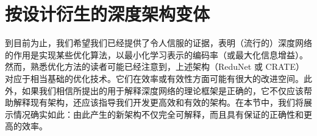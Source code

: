 \documentclass[../../book-main.tex]{subfiles}
\begin{document}
\begin{table*}[t!]
\centering
\caption{\small \textsc{crate} 在不同模型规模下，在 ImageNet-1K 上预训练后，在各种数据集上的 Top-1 分类准确率。对于 ImageNet-1K/ImageNet-1K ReaL，我们直接评估 top-1 准确率。对于其他数据集，我们使用在 ImageNet 上预训练的模型作为初始化，并通过微调评估迁移学习性能。}
\label{tab:crate_comparison_with_sota}
\small
    \setlength{\tabcolsep}{13.6pt}
\end{table*}



\section{按设计衍生的深度架构变体} \label{sec:chap4-derive-white-box-transformer-variants}

到目前为止，我们希望我们已经提供了令人信服的证据，表明（流行的）深度网络的作用是实现某些优化算法，以最小化学习表示的编码率（或最大化信息增益）。然而，熟悉优化方法的读者可能已经注意到，上述架构（ReduNet 或 CRATE）对应于相当基础的优化技术。它们在效率或有效性方面可能有很大的改进空间。此外，如果我们相信所提出的用于解释深度网络的理论框架是正确的，它不仅应该帮助解释现有架构，还应该指导我们开发更高效和有效的架构。在本节中，我们将展示情况确实如此：由此产生的新架构不仅完全可解释，而且具有保证的正确性和更高的效率。
\end{document}
